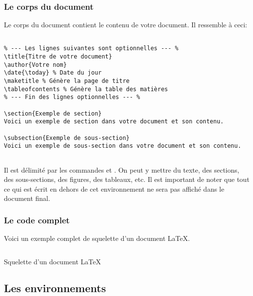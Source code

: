 \subsubsection{Le corps du document}
Le corps du document contient le contenu de votre document.
Il ressemble à ceci:
\begin{verbatim}

% --- Les lignes suivantes sont optionnelles --- %
\title{Titre de votre document}
\author{Votre nom}
\date{\today} % Date du jour
\maketitle % Génère la page de titre
\tableofcontents % Génère la table des matières
% --- Fin des lignes optionnelles --- %

\section{Exemple de section}
Voici un exemple de section dans votre document et son contenu.

\subsection{Exemple de sous-section}
Voici un exemple de sous-section dans votre document et son contenu.


\end{verbatim}

Il est délimité par les commandes \texttt{} et \texttt{}.
On peut y mettre du texte, des sections, des sous-sections, des figures, des tableaux, etc.
Il est important de noter que tout ce qui est écrit en dehors de cet environnement ne sera pas 
affiché dans le document final.

\subsubsection{Le code complet}
Voici un exemple complet de squelette d'un document LaTeX.

\begin{listing}[H]
\inputminted[frame=single, breaklines]{latex}{./3_Structure/latex_skeleton.tex}
\caption{Squelette d'un document LaTeX}
\label{lst:latex_skeleton}
\end{listing}


\subsection{Les environnements}\label{subsec:latex_environments}

